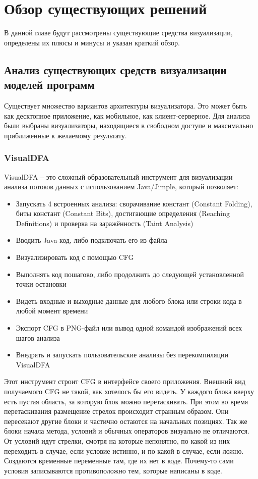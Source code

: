 \chapter{Обзор существующих решений} \label{ch2}
В данной главе будут рассмотрены существующие средства визуализации, определены их плюсы и минусы и указан краткий обзор.
\section{Анализ существующих средств визуализации моделей программ} \label{ch2:sec1}
Существует множество вариантов архитектуры визуализатора. Это может быть как десктопное приложение, как мобильное, как клиент-серверное. Для анализа были выбраны визуализаторы, находящиеся в свободном доступе и максимально приближенные к желаемому результату.
\subsection{VisualDFA} \label{ch2:subsec-title-abbr}
VisualDFA – это сложный образовательный инструмент для визуализации анализа потоков данных с использованием Java/Jimple, который позволяет:
\begin{itemize}
\item Запускать 4 встроенных анализа: сворачивание констант (Constant Folding), биты констант (Constant Bits), достигающие определения (Reaching Definitions) и проверка на заражённость (Taint Analysis)
\item Вводить Java-код, либо подключать его из файла
\item Визуализировать код с помощью CFG
\item Выполнять код пошагово, либо продолжить до следующей установленной точки остановки
\item Видеть входные и выходные данные для любого блока или строки кода в любой момент времени
\item Экспорт CFG в PNG-файл или вывод одной командой изображений всех шагов анализа
\item Внедрять и запускать пользовательские анализы без перекомпиляции VisualDFA
\end{itemize}

Этот инструмент строит CFG в интерфейсе своего приложения. Внешний вид получаемого CFG не такой, как хотелось бы его видеть. У каждого блока вверху есть пустая область, за которую блок можно перетаскивать. При этом во время перетаскивания размещение стрелок происходит странным образом. Они пересекают другие блоки и частично остаются на начальных позициях. Так же блоки начала метода, условий и обычных операторов визуально не отличаются. От условий идут стрелки, смотря на которые непонятно, по какой из них переходить в случае, если условие истинно, и по какой в случае, если ложно. Создаются временные переменные там, где их нет в коде. Почему-то сами условия записываются противоположно тем, которые написаны в коде.

